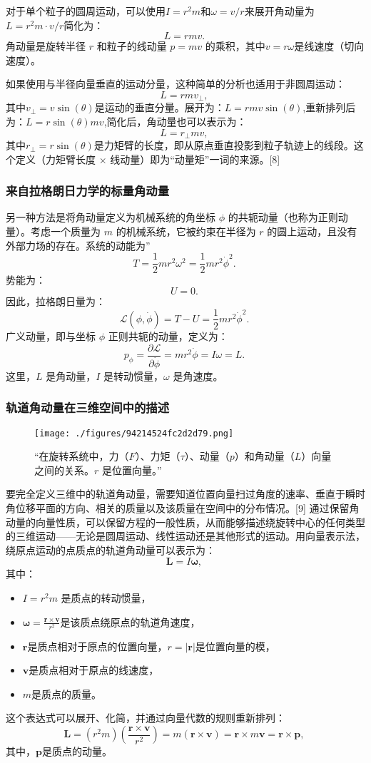 对于单个粒子的圆周运动，可以使用\(I = r^2 m\)和\(\omega = v/r\)来展开角动量为\(L = r^2 m \cdot v/r\)简化为：
\[
L = rmv.~
\]
角动量是旋转半径 \( r \) 和粒子的线动量 \( p = mv \) 的乘积，其中\(v = r\omega\)是线速度（切向速度）。

如果使用与半径向量垂直的运动分量，这种简单的分析也适用于非圆周运动：
\[
L = rmv_{\perp},~
\]
其中\(v_{\perp} = v\sin(\theta)\)是运动的垂直分量。展开为：\(L = rmv\sin(\theta)\),重新排列后为：\(L = r\sin(\theta) mv\),简化后，角动量也可以表示为：
\[
L = r_{\perp} mv,~
\]
其中\(r_{\perp} = r\sin(\theta)\)是力矩臂的长度，即从原点垂直投影到粒子轨迹上的线段。这个定义（力矩臂长度 × 线动量）即为“动量矩”一词的来源。[8]
\subsubsection{来自拉格朗日力学的标量角动量 } 
另一种方法是将角动量定义为机械系统的角坐标 \(\phi\) 的共轭动量（也称为正则动量）。考虑一个质量为 \(m\) 的机械系统，它被约束在半径为 \(r\) 的圆上运动，且没有外部力场的存在。系统的动能为” 
\[ T = \frac{1}{2}mr^2\omega^2 = \frac{1}{2}mr^2{\dot{\phi}}^2. ~\]
势能为：  
\[ U = 0.~ \]
因此，拉格朗日量为：  
\[ \mathcal{L}(\phi, \dot{\phi}) = T - U = \frac{1}{2}mr^2{\dot{\phi}}^2. ~\]
广义动量，即与坐标 \(\phi\) 正则共轭的动量，定义为：  
\[ p_\phi = \frac{\partial \mathcal{L}}{\partial \dot{\phi}} = mr^2{\dot{\phi}} = I\omega = L.~ \]
这里，\(L\) 是角动量，\(I\) 是转动惯量，\(\omega\) 是角速度。
\subsubsection{轨道角动量在三维空间中的描述}
\begin{figure}[ht]
\centering
\texttt{[image: ./figures/94214524fc2d2d79.png]}
\caption{“在旋转系统中，力（\( F \)）、力矩（\( \tau \)）、动量（\( p \)）和角动量（\( L \)）向量之间的关系。\( r \) 是位置向量。”} \label{fig_JDL_2}
\end{figure}
要完全定义三维中的轨道角动量，需要知道位置向量扫过角度的速率、垂直于瞬时角位移平面的方向、相关的质量以及该质量在空间中的分布情况。[9] 通过保留角动量的向量性质，可以保留方程的一般性质，从而能够描述绕旋转中心的任何类型的三维运动——无论是圆周运动、线性运动还是其他形式的运动。用向量表示法，绕原点运动的点质点的轨道角动量可以表示为：
\[ \mathbf {L} = I{\boldsymbol {\omega }}, ~\]
其中：
\begin{itemize}
\item \(I = r^2 m\) 是质点的转动惯量，
\item \({\boldsymbol {\omega }} = \frac {\mathbf {r} \times \mathbf {v} }{r^2}\)是该质点绕原点的轨道角速度，
\item \(\mathbf {r} \)是质点相对于原点的位置向量，\(r = |\mathbf {r}|\)是位置向量的模，
\item \(\mathbf {v} \)是质点相对于原点的线速度，
\item \(m \)是质点的质量。
\end{itemize}
这个表达式可以展开、化简，并通过向量代数的规则重新排列：
\[ \mathbf {L} = \left(r^2 m\right)\left(\frac {\mathbf {r} \times \mathbf {v} }{r^2}\right) = m\left(\mathbf {r} \times \mathbf {v} \right) = \mathbf {r} \times m\mathbf {v} = \mathbf {r} \times \mathbf {p},~ \]
其中，\(\mathbf {p}\)是质点的动量。

